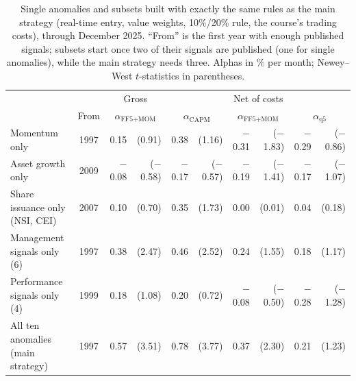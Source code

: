 \documentclass[12pt,a4paper]{article}
\begin{document}
\begin{singlespace}
\begin{table}[!htbp]\centering
\caption{Single anomalies and subsets built with exactly the same rules as the main strategy (real-time entry, value weights, 10\%/20\% rule, the course's trading costs), through December 2025. ``From'' is the first year with enough published signals; subsets start once two of their signals are published (one for single anomalies), while the main strategy needs three. Alphas in \% per month; Newey--West $t$-statistics in parentheses.}\label{tab:alternatives}
\footnotesize
\setlength{\tabcolsep}{2pt}\begin{tabular}{lcrrrrrrrr}\toprule
 & & \multicolumn{2}{c}{Gross} & \multicolumn{6}{c}{Net of costs}\\
 & From & \multicolumn{2}{c}{$\alpha_{\text{FF5+MOM}}$} & \multicolumn{2}{c}{$\alpha_{\text{CAPM}}$} & \multicolumn{2}{c}{$\alpha_{\text{FF5+MOM}}$} & \multicolumn{2}{c}{$\alpha_{\text{q5}}$}\\\midrule
Momentum only & 1997 & 0.15 & (0.91) & 0.38 & (1.16) & \ensuremath{-}0.31 & (\ensuremath{-}1.83) & \ensuremath{-}0.29 & (\ensuremath{-}0.86)\\
Asset growth only & 2009 & \ensuremath{-}0.08 & (\ensuremath{-}0.58) & \ensuremath{-}0.17 & (\ensuremath{-}0.57) & \ensuremath{-}0.19 & (\ensuremath{-}1.41) & \ensuremath{-}0.17 & (\ensuremath{-}1.07)\\
Share issuance only (NSI, CEI) & 2007 & 0.10 & (0.70) & 0.35 & (1.73) & 0.00 & (0.01) & 0.04 & (0.18)\\
Management signals only (6) & 1997 & 0.38 & (2.47) & 0.46 & (2.52) & 0.24 & (1.55) & 0.18 & (1.17)\\
Performance signals only (4) & 1999 & 0.18 & (1.08) & 0.20 & (0.72) & \ensuremath{-}0.08 & (\ensuremath{-}0.50) & \ensuremath{-}0.28 & (\ensuremath{-}1.28)\\
All ten anomalies (main strategy) & 1997 & 0.57 & (3.51) & 0.78 & (3.77) & 0.37 & (2.30) & 0.21 & (1.23)\\
\bottomrule\end{tabular}
\end{table}


\end{singlespace}
\end{document}
